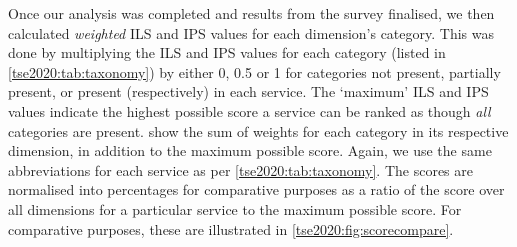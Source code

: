 Once our analysis was completed and results from the survey finalised, we then calculated \textit{weighted} ILS and IPS values for each dimension's category. This was done by multiplying the ILS and IPS values for each category (listed in \cref{tse2020:tab:taxonomy}) by either 0, 0.5 or 1 for categories not present, partially present, or present (respectively) in each service. The `maximum' ILS and IPS values indicate the highest possible score a service can be ranked as though \textit{all} categories are present.  show the sum of weights for each category in its respective dimension, in addition to the maximum possible score. Again, we use the same abbreviations for each service as per \cref{tse2020:tab:taxonomy}. The scores are normalised into percentages for comparative purposes as a ratio of the score over all dimensions for a particular service to the maximum possible score. For comparative purposes, these are illustrated in \cref{tse2020:fig:scorecompare}.

